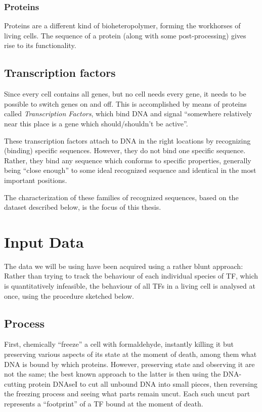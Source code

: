 \documentclass[fleqn]{book}
\begin{document}
\subsection{Proteins}\label{proteins}

Proteins are a different kind of bioheteropolymer, forming the
workhorses of living cells. The sequence of a protein (along with some
post-processing) gives rise to its functionality.

\section{Transcription factors}\label{transcription-factors}

Since every cell contains all genes, but no cell needs every gene, it
needs to be possible to switch genes on and off. This is accomplished by
means of proteins called \emph{Transcription Factors}, which bind DNA
and signal ``somewhere relatively near this place is a gene which
should/shouldn't be active''.

These transcription factors attach to DNA in the right locations by
recognizing (binding) specific sequences. However, they do not bind one
specific sequence. Rather, they bind any sequence which conforms to
specific properties, generally being ``close enough'' to some ideal
recognized sequence and identical in the most important positions.

The characterization of these families of recognized sequences, based on
the dataset described below, is the focus of this thesis.

\chapter{Input Data}\label{input-data}

The data we will be using have been acquired using a rather blunt
approach: Rather than trying to track the behaviour of each individual
species of TF, which is quantitatively infeasible, the behaviour of all
TFs in a living cell is analysed at once, using the procedure sketched
below.

\section{Process}\label{process}

First, chemically ``freeze'' a cell with formaldehyde, instantly killing
it but preserving various aspects of its state at the moment of death,
among them what DNA is bound by which proteins. However, preserving
state and observing it are not the same; the best known approach to the
latter is then using the DNA-cutting protein DNAseI to cut all unbound
DNA into small pieces, then reversing the freezing process and seeing
what parts remain uncut. Each such uncut part represents a ``footprint''
of a TF bound at the moment of death.
\end{document}
